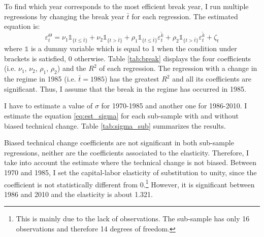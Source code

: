To find which year corresponds to the most efficient break year, I run multiple regressions by changing the break year $\bar{t}$ for each regression. The estimated equation is:
	\begin{equation*}
		\varepsilon_t^{\Theta} = \nu_1 \mathds{1}_{\lbrace t \leq \bar{t} \rbrace} + \nu_2 \mathds{1}_{\lbrace t > \bar{t} \rbrace} + \rho_1 \mathds{1}_{\lbrace t \leq \bar{t} \rbrace} \varepsilon_t^{\tilde{k}} + \rho_2 \mathds{1}_{\lbrace t > \bar{t} \rbrace} \varepsilon_t^{\tilde{k}} + \zeta_t
	\end{equation*}
where $\mathds{1}$ is a dummy variable which is equal to 1 when the condition under brackets is satisfied, 0 otherwise. Table \ref{tab:break} displays the four coefficients (i.e. $\nu_1$, $\nu_2$, $\rho_1$, $\rho_2$) and the $R^2$ of each regression. The regression with a change in the regime in 1985 (i.e. $\bar{t} = 1985$) has the greatest $R^2$ and all its coefficients are significant. Thus, I assume that the break in the regime has occurred in 1985.

I have to estimate a value of $\sigma$ for 1970-1985 and another one for 1986-2010. I estimate the equation \eqref{eq:est_sigma} for each sub-sample with and without biased technical change. Table \ref{tab:sigma_sub} summarizes the results. 
	
Biased technical change coefficients are not significant in both sub-sample regressions, neither are the coefficients associated to the elasticity. Therefore, I take into account the estimate where the technical change is not biased. Between 1970 and 1985, I set the capital-labor elasticity of substitution to unity, since the coefficient is not statistically different from 0.\footnote{This is mainly due to the lack of observations. The sub-sample has only 16 observations and therefore 14 degrees of freedom.} However, it is significant between 1986 and 2010 and the elasticity is about 1.321.